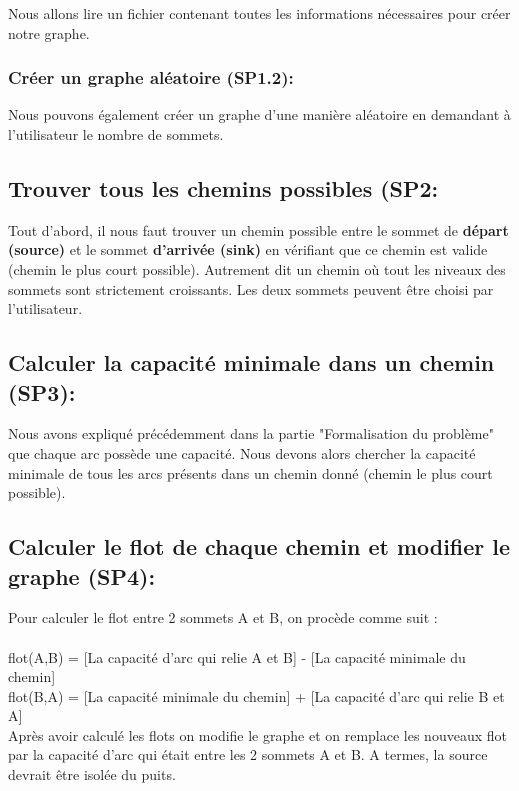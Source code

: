 \documentclass[a4paper, 11pt, oneside]{article}
\begin{document}
Nous allons lire un fichier contenant toutes les informations nécessaires pour créer notre graphe.

\subsubsection{Créer un graphe aléatoire (SP1.2):}

Nous pouvons également créer un graphe d'une manière aléatoire en demandant à l'utilisateur le nombre de sommets.

\subsection{Trouver tous les chemins possibles (SP2:}

Tout d’abord, il nous faut trouver un chemin possible entre le sommet de \textbf{départ (source)} et le sommet \textbf{d'arrivée (sink)} en vérifiant que ce chemin est valide (chemin le plus court possible). Autrement dit un chemin où tout les niveaux des sommets sont strictement croissants. Les deux sommets peuvent être choisi par l’utilisateur.

\subsection{Calculer la capacité minimale dans un chemin (SP3):}

Nous avons expliqué précédemment dans la partie "Formalisation du problème" que chaque arc possède une capacité. Nous devons alors chercher la capacité minimale de tous les arcs présents dans un chemin donné (chemin le plus court possible).

\subsection{Calculer le flot de chaque chemin et modifier le graphe (SP4):}

Pour calculer le flot entre 2 sommets A et B, on procède comme suit : \\\\
flot(A,B) = [La capacité d'arc qui relie A et B] - [La capacité minimale du chemin]\\
flot(B,A) = [La capacité minimale du chemin] + [La capacité d'arc qui relie B et A]\\
Après avoir calculé les flots on modifie le graphe et on remplace les nouveaux flot par la capacité d'arc qui était entre les 2 sommets A et B.
A termes, la source devrait être isolée du puits.
\end{document}
